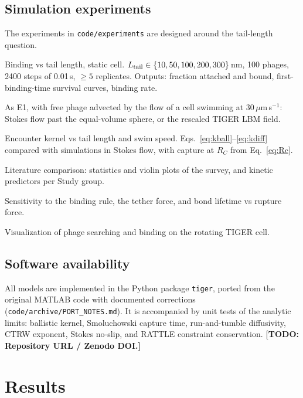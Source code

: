 \documentclass[12pt]{article}
\newcommand{\todo}[1]{{\color{blue}\textbf{[TODO: #1]}}}
\begin{document}
\subsection*{Simulation experiments}
The experiments in \texttt{code/experiments} are designed around the tail-length question.
\begin{description}\setlength\itemsep{0pt}
\item[E1] Binding vs tail length, static cell. $L_{\rm tail}\in\{10,50,100,200,300\}$\,nm, 100 phages, 2400 steps of 0.01\,s, $\ge5$ replicates. Outputs: fraction attached and bound, first-binding-time survival curves, binding rate.
\item[E2] As E1, with free phage advected by the flow of a cell swimming at 30\,$\mu$m\,s$^{-1}$: Stokes flow past the equal-volume sphere, or the rescaled TIGER LBM field.
\item[E3] Encounter kernel vs tail length and swim speed. Eqs.~\eqref{eq:kball}--\eqref{eq:kdiff} compared with simulations in Stokes flow, with capture at $R_C$ from Eq.~\eqref{eq:Rc}.
\item[E4] Literature comparison: statistics and violin plots of the survey, and kinetic predictors per Study group.
\item[E5] Sensitivity to the binding rule, the tether force, and bond lifetime vs rupture force.
\item[E6] Visualization of phage searching and binding on the rotating TIGER cell.
\end{description}

\subsection*{Software availability}
All models are implemented in the Python package \texttt{tiger}, ported from the original MATLAB code with documented corrections (\texttt{code/archive/PORT\_NOTES.md}). It is accompanied by unit tests of the analytic limits: ballistic kernel, Smoluchowski capture time, run-and-tumble diffusivity, CTRW exponent, Stokes no-slip, and RATTLE constraint conservation. \todo{Repository URL / Zenodo DOI.}

\section*{Results}
\end{document}
